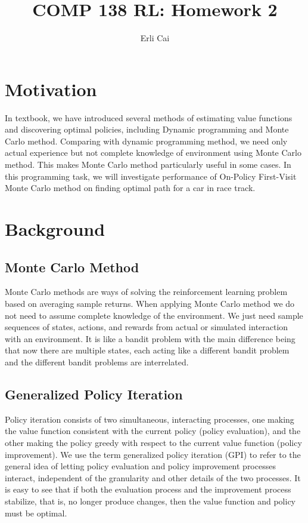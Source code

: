 \documentclass[12pt]{article}
\title{COMP 138 RL: Homework 2}
\author{Erli Cai}
\begin{document}
\maketitle
\setlength\parindent{0pt}


\section{Motivation}
In textbook, we have introduced several methods of estimating value functions and discovering optimal policies, including Dynamic programming and Monte Carlo method. Comparing with dynamic programming method, we need only actual experience but not complete knowledge of environment using Monte Carlo method. This makes Monte Carlo method particularly useful in some cases. In this programming task, we will investigate performance of On-Policy First-Visit Monte Carlo method on finding optimal path for a car in race track.


\section{Background}
\subsection{Monte Carlo Method}
Monte Carlo methods are ways of solving the reinforcement learning problem based on averaging sample returns. When applying Monte Carlo method we do not need to assume complete knowledge of the environment. We just need sample sequences of states, actions, and rewards from actual or simulated interaction with an environment. It is like a bandit problem with the main difference being that now there are multiple states, each acting like a different bandit problem and the different bandit problems are interrelated.


\subsection{Generalized Policy Iteration}
Policy iteration consists of two simultaneous, interacting processes, one making the value function consistent with the current policy (policy evaluation), and the other making the policy greedy with respect to the current value function (policy improvement). We use the term generalized policy iteration (GPI) to refer to the general idea of letting policy evaluation and policy improvement processes interact, independent of the granularity and other details of the two processes. It is easy to see that if both the evaluation process and the improvement process stabilize, that is, no longer produce changes, then the value function and policy must be optimal.
\end{document}
